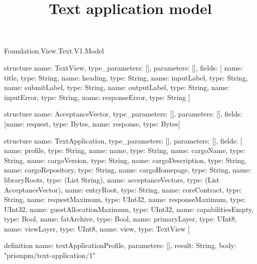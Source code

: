 \begin{lexlean}{Foundation.View.Text.V1.Model}
\title{Text application model}
\begin{semanticmodule}
structure{
  name: TextView,
  type_parameters: [],
  parameters: [],
  fields: [
    {name: title, type: String},
    {name: heading, type: String},
    {name: inputLabel, type: String},
    {name: submitLabel, type: String},
    {name: outputLabel, type: String},
    {name: inputError, type: String},
    {name: responseError, type: String}
  ]
}

structure{
  name: AcceptanceVector,
  type_parameters: [],
  parameters: [],
  fields: [{name: request, type: Bytes}, {name: response, type: Bytes}]
}

structure{
  name: TextApplication,
  type_parameters: [],
  parameters: [],
  fields: [
    {name: profile, type: String},
    {name: name, type: String},
    {name: cargoName, type: String},
    {name: cargoVersion, type: String},
    {name: cargoDescription, type: String},
    {name: cargoRepository, type: String},
    {name: cargoHomepage, type: String},
    {name: libraryRoots, type: (List String)},
    {name: acceptanceVectors, type: (List AcceptanceVector)},
    {name: entryRoot, type: String},
    {name: coreContract, type: String},
    {name: requestMaximum, type: UInt32},
    {name: responseMaximum, type: UInt32},
    {name: guestAllocationMaximum, type: UInt32},
    {name: capabilitiesEmpty, type: Bool},
    {name: fatArchive, type: Bool},
    {name: primaryLayer, type: UInt8},
    {name: viewLayer, type: UInt8},
    {name: view, type: TextView}
  ]
}

definition{
  name: textApplicationProfile,
  parameters: [],
  result: String,
  body: "prismpm/text-application/1"
}
\end{semanticmodule}
\end{lexlean}
